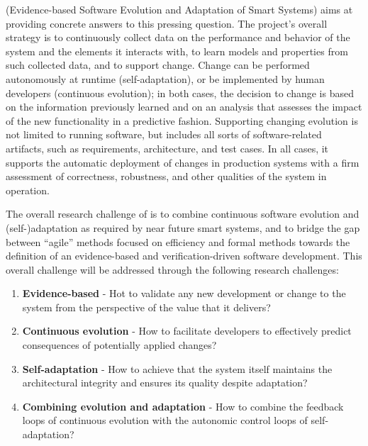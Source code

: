 \documentclass[12pt]{article}
\begin{document}
\name{} (Evidence-based Software Evolution and Adaptation of Smart Systems) 
aims at providing concrete answers to this pressing question. The project's overall strategy is to continuously collect data on the performance and behavior of the system and the elements it interacts with, to learn models and properties from such collected data, and to support change. %
Change can be performed autonomously at runtime (self-adaptation), or be implemented by human developers (continuous evolution); in both cases, the decision to change is based on the information previously learned and on an analysis that assesses the impact of the new functionality in a predictive fashion. %
Supporting changing evolution is not limited to running software, but includes all sorts of software-related artifacts, such as requirements, architecture, and test cases.
In all cases, it supports the automatic deployment of changes in production systems with a firm assessment of correctness, robustness, and other qualities of the system in operation.

The overall research challenge of \name{} is to combine continuous software evolution and (self-)adaptation as required by near future smart systems, and to
bridge the gap between ``agile'' methods focused on efficiency and formal methods towards the definition of an evidence-based and verification-driven software development. This overall challenge will be addressed through the following research challenges:

\begin{enumerate}
\item {\bf Evidence-based} - Hot to validate any new development or change to the system from the perspective of the value that it delivers?
\item {\bf Continuous evolution} - How to facilitate developers to effectively predict consequences of potentially applied changes?
\item {\bf Self-adaptation} - How to achieve that the system itself maintains the architectural integrity and ensures its quality despite adaptation?
\item {\bf Combining evolution and adaptation} - How to combine the feedback loops of continuous evolution with the autonomic control loops of self-adaptation?
\end{enumerate}
\end{document}
